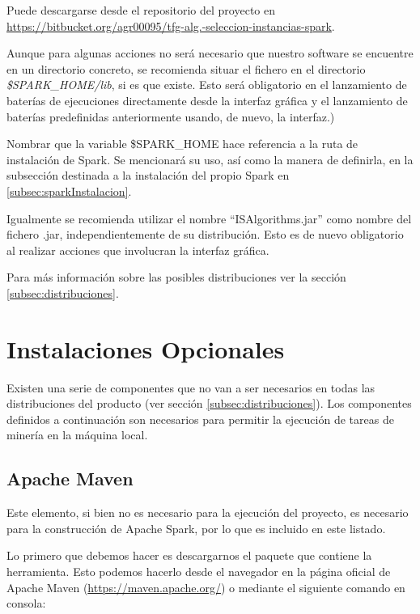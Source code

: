 Puede descargarse desde el repositorio del proyecto en \url{https://bitbucket.org/agr00095/tfg-alg.-seleccion-instancias-spark}.

Aunque para algunas acciones no será necesario que nuestro software se encuentre en un directorio concreto, se recomienda situar el fichero en el directorio \textit{\$SPARK\_HOME/lib}, si es que existe. Esto será obligatorio en el lanzamiento de baterías de ejecuciones directamente desde la interfaz gráfica y el lanzamiento de baterías predefinidas anteriormente usando, de nuevo, la interfaz.)

Nombrar que la variable \$SPARK\_HOME hace referencia a la ruta de instalación de Spark. Se mencionará su uso, así como la manera de definirla, en la subsección destinada a la instalación del propio Spark en \ref{subsec:sparkInstalacion}.

Igualmente se recomienda utilizar el nombre ``ISAlgorithms.jar'' como nombre del fichero .jar, independientemente de su distribución. Esto es de nuevo obligatorio al realizar acciones que involucran la interfaz gráfica.

Para más información sobre las posibles distribuciones ver la sección \ref{subsec:distribuciones}.


\section{Instalaciones Opcionales}\label{sec:InstalacionOpcional}

Existen una serie de componentes que no van a ser necesarios en todas las distribuciones del producto (ver sección \ref{subsec:distribuciones}). Los componentes definidos a continuación son necesarios para permitir la ejecución de tareas de minería en la máquina local.

\subsection{Apache Maven}\label{subsec:instalaMaven}

Este elemento, si bien no es necesario para la ejecución del proyecto, es necesario para la construcción de Apache Spark, por lo que es incluido en este listado.

Lo primero que debemos hacer es descargarnos el paquete que contiene la herramienta. Esto podemos hacerlo desde el navegador en la página oficial de Apache Maven (\url{https://maven.apache.org/}) o mediante el siguiente comando en consola:


